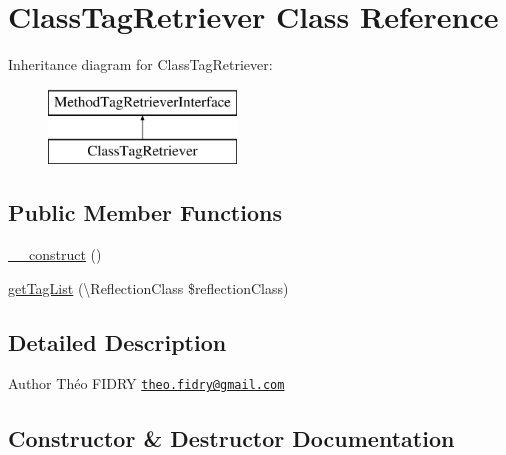 \hypertarget{class_prophecy_1_1_php_documentor_1_1_class_tag_retriever}{}\section{Class\+Tag\+Retriever Class Reference}
\label{class_prophecy_1_1_php_documentor_1_1_class_tag_retriever}
Inheritance diagram for Class\+Tag\+Retriever\+:\begin{figure}[H]
\begin{center}
\leavevmode
\includegraphics[height=2.000000cm]{class_prophecy_1_1_php_documentor_1_1_class_tag_retriever}
\end{center}
\end{figure}
\subsection*{Public Member Functions}
\begin{DoxyCompactItemize}
\item 
\mbox{\hyperlink{class_prophecy_1_1_php_documentor_1_1_class_tag_retriever_a095c5d389db211932136b53f25f39685}{\+\_\+\+\_\+construct}} ()
\item 
\mbox{\hyperlink{class_prophecy_1_1_php_documentor_1_1_class_tag_retriever_a2eb68ce00dcc84a156b9a2b7844a5e6f}{get\+Tag\+List}} (\textbackslash{}Reflection\+Class \$reflection\+Class)
\end{DoxyCompactItemize}


\subsection{Detailed Description}
\begin{DoxyAuthor}{Author}
Théo F\+I\+D\+RY \href{mailto:theo.fidry@gmail.com}{\tt theo.\+fidry@gmail.\+com} 
\end{DoxyAuthor}


\subsection{Constructor \& Destructor Documentation}
\mbox{\label{class_prophecy_1_1_php_documentor_1_1_class_tag_retriever_a095c5d389db211932136b53f25f39685}} 

